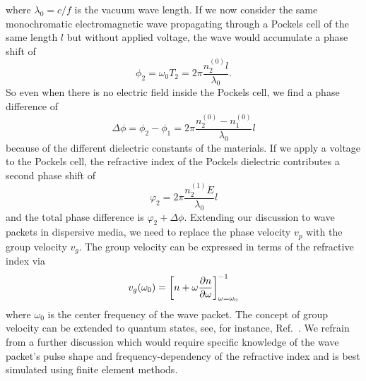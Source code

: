where $\lambda_0=c/f$ is the vacuum wave length.
If we now consider the same monochromatic electromagnetic wave propagating through a Pockels cell of the same length $l$ but without applied voltage, the wave would accumulate a phase shift of
\begin{equation}
	\phi_2
	=
	\omega_0T_2
	=
	2\pi\frac{n_2^{(0)}l}{\lambda_0}
	.
\end{equation}
So even when there is no electric field inside the Pockels cell, we find a phase difference of
\begin{equation}
	\Delta\phi
	=
	\phi_2
	-
	\phi_1
	=
	2\pi\frac{n_2^{(0)}-n_1^{(0)}}{\lambda_0}l
\end{equation}
because of the different dielectric constants of the materials.
If we apply a voltage to the Pockels cell, the refractive index of the Pockels dielectric contributes a second phase shift of
\begin{equation}
	\varphi_2
	=
	2\pi\frac{n_2^{(1)}E}{\lambda_0}l
\end{equation}
and the total phase difference is $\varphi_2+\Delta\phi$.
Extending our discussion to wave packets in dispersive media, we need to replace the phase velocity $v_p$ with the group velocity $v_g$.
The group velocity can be expressed in terms of the refractive index via~\cite[p.~211]{Jackson2007}
\begin{equation}
	v_g(\omega_0)
	=
	\left[
		n
		+
		\omega
		\pdv{n}{\omega}
	\right]^{-1}_{\omega=\omega_0}
\end{equation}
where $\omega_0$ is the center frequency of the wave packet.
The concept of group velocity can be extended to quantum states, see, for instance, Ref.~\cite[p.~3]{Naumov2013}.
We refrain from a further discussion which would require specific knowledge of the wave packet's pulse shape and frequency-dependency of the refractive index and is best simulated using finite element methods.

